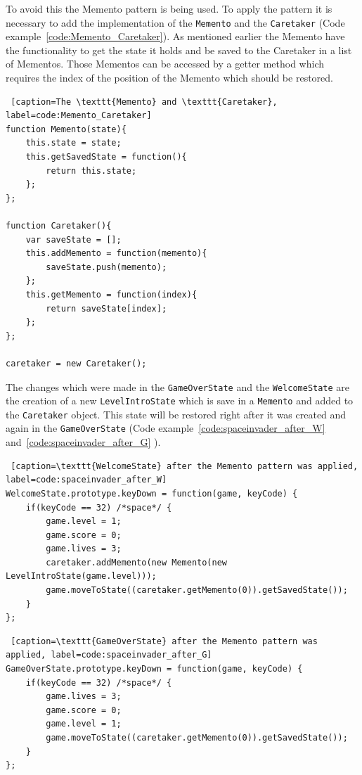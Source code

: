 \documentclass{bioinfo}
\begin{document}
To avoid this the Memento pattern is being used. To apply the pattern it is necessary to add the implementation of the \texttt{Memento} and the \texttt{Caretaker} (Code example~\ref{code:Memento_Caretaker}). As mentioned earlier the Memento have the functionality to get the state it holds and be saved to the Caretaker in a list of Mementos. Those Mementos can be accessed by a getter method which requires the index of the position of the Memento which should be restored.
\begin{lstlisting} [caption=The \texttt{Memento} and \texttt{Caretaker}, label=code:Memento_Caretaker]
function Memento(state){
	this.state = state;
	this.getSavedState = function(){
		return this.state;
	};
};

function Caretaker(){
	var saveState = [];
	this.addMemento = function(memento){
		saveState.push(memento);
	};
	this.getMemento = function(index){
		return saveState[index];
	};
};

caretaker = new Caretaker();
\end{lstlisting}

The changes which were made in the \texttt{GameOverState} and the \texttt{WelcomeState} are the creation of a new \texttt{LevelIntroState} which is save in a \texttt{Memento} and added to the \texttt{Caretaker} object. This state will be restored right after it was created and again in the \texttt{GameOverState} (Code example~\ref{code:spaceinvader_after_W} and~\ref{code:spaceinvader_after_G} ).

\begin{lstlisting} [caption=\texttt{WelcomeState} after the Memento pattern was applied, label=code:spaceinvader_after_W]
WelcomeState.prototype.keyDown = function(game, keyCode) {
    if(keyCode == 32) /*space*/ {
        game.level = 1;
        game.score = 0;
        game.lives = 3;
        caretaker.addMemento(new Memento(new LevelIntroState(game.level)));
        game.moveToState((caretaker.getMemento(0)).getSavedState());
    }
};
\end{lstlisting}

\begin{lstlisting} [caption=\texttt{GameOverState} after the Memento pattern was applied, label=code:spaceinvader_after_G]
GameOverState.prototype.keyDown = function(game, keyCode) {
    if(keyCode == 32) /*space*/ {
        game.lives = 3;
        game.score = 0;
        game.level = 1;
        game.moveToState((caretaker.getMemento(0)).getSavedState());
    }
};
\end{lstlisting}
\end{document}
